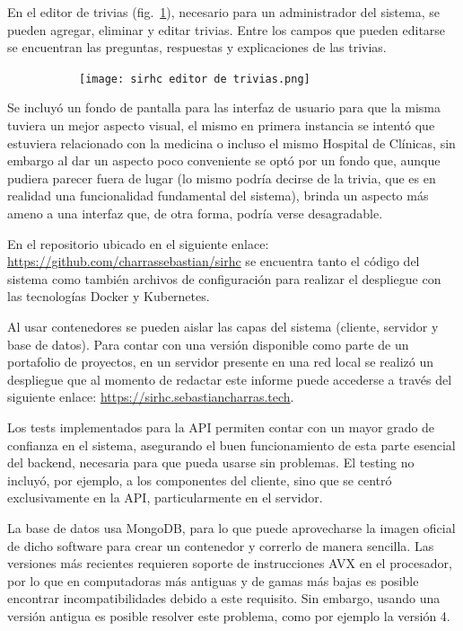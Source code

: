 \documentclass[twoside]{article}
\begin{document}
\vspace{-1.0\baselineskip}
En el editor de trivias (fig.~\ref{fig:editorTrivias}), necesario para un administrador del sistema, se pueden agregar, eliminar y editar trivias. Entre los campos que pueden editarse se encuentran las preguntas, respuestas y explicaciones de las trivias.
\begin{figure}[H]
	\caption{Interfaz del editor de trivias}
    \begin{subfigure}{1\textwidth}
	\texttt{[image: sirhc editor de trivias.png]}
    \end{subfigure}
	\label{fig:editorTrivias}
\end{figure}
\vspace{-1.0\baselineskip}
Se incluyó un fondo de pantalla para las interfaz de usuario para que la misma tuviera un mejor aspecto visual, el mismo en primera instancia se intentó que estuviera relacionado con la medicina o incluso el mismo Hospital de Clínicas, sin embargo al dar un aspecto poco conveniente se optó por un fondo que, aunque pudiera parecer fuera de lugar (lo mismo podría decirse de la trivia, que es en realidad una funcionalidad fundamental del sistema), brinda un aspecto más ameno a una interfaz que, de otra forma, podría verse desagradable.

En el repositorio ubicado en el siguiente enlace: \href{https://github.com/charrassebastian/sirhc}{https://github.com/charrassebastian/sirhc} se encuentra tanto el código del sistema como también archivos de configuración para realizar el despliegue con las tecnologías Docker y Kubernetes.

Al usar contenedores se pueden aislar las capas del sistema (cliente, servidor y base de datos). Para contar con una versión disponible como parte de un portafolio de proyectos, en un servidor presente en una red local se realizó un despliegue que al momento de redactar este informe puede accederse a través del siguiente enlace: \href{https://sirhc.sebastiancharras.tech}{https://sirhc.sebastiancharras.tech}.

Los tests implementados para la API permiten contar con un mayor grado de confianza en el sistema, asegurando el buen funcionamiento de esta parte esencial del backend, necesaria para que pueda usarse sin problemas. El testing no incluyó, por ejemplo, a los componentes del cliente, sino que se centró exclusivamente en la API, particularmente en el servidor.

La base de datos usa MongoDB, para lo que puede aprovecharse la imagen oficial de dicho software para crear un contenedor y correrlo de manera sencilla. Las versiones más recientes requieren soporte de instrucciones AVX en el procesador, por lo que en computadoras más antiguas y de gamas más bajas es posible encontrar incompatibilidades debido a este requisito. Sin embargo, usando una versión antigua es posible resolver este problema, como por ejemplo la versión 4.
\newpage
\end{document}
